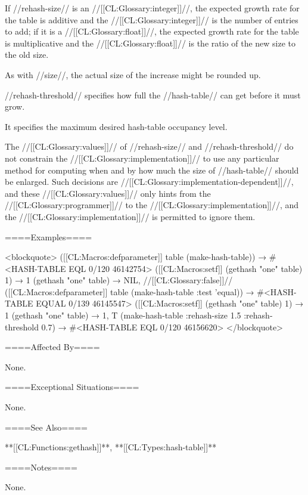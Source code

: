 If //rehash-size// is an //[[CL:Glossary:integer]]//, the expected growth rate for the table is additive and the //[[CL:Glossary:integer]]// is the number of entries to add; if it is a //[[CL:Glossary:float]]//, the expected growth rate for the table is multiplicative and the //[[CL:Glossary:float]]// is the ratio of the new size to the old size.

As with //size//, the actual size of the increase might be rounded up.

//rehash-threshold// specifies how full the //hash-table// can get before it must grow.

It specifies the maximum desired hash-table occupancy level.

The //[[CL:Glossary:values]]// of //rehash-size// and //rehash-threshold// do not constrain the //[[CL:Glossary:implementation]]// to use any particular method for computing when and by how much the size of //hash-table// should be enlarged. Such decisions are //[[CL:Glossary:implementation-dependent]]//, and these //[[CL:Glossary:values]]// only hints from the //[[CL:Glossary:programmer]]// to the //[[CL:Glossary:implementation]]//, and the //[[CL:Glossary:implementation]]// is permitted to ignore them.

====Examples====

<blockquote> ([[CL:Macros:defparameter]] table (make-hash-table)) → #<HASH-TABLE EQL 0/120 46142754> ([[CL:Macros:setf]] (gethash "one" table) 1) → 1 (gethash "one" table) → NIL, //[[CL:Glossary:false]]// ([[CL:Macros:defparameter]] table (make-hash-table :test 'equal)) → #<HASH-TABLE EQUAL 0/139 46145547> ([[CL:Macros:setf]] (gethash "one" table) 1) → 1 (gethash "one" table) → 1, T (make-hash-table :rehash-size 1.5 :rehash-threshold 0.7) → #<HASH-TABLE EQL 0/120 46156620> </blockquote>

====Affected By====

None.

====Exceptional Situations====

None.

====See Also====

**[[CL:Functions:gethash]]**, **[[CL:Types:hash-table]]**

====Notes====

None.

       
